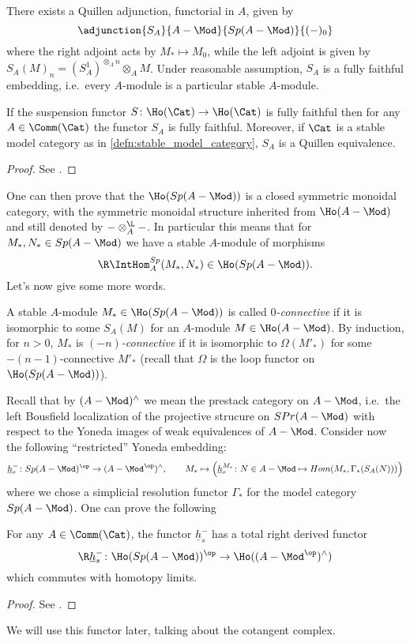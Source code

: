         There exists a Quillen adjunction, functorial in $A$, given by \[\adjunction{S_A}{A-\Mod}{Sp(A-\Mod)}{(-)_0} \] where the right adjoint acts by $M_* \mapsto M_0$, while the left adjoint is given by $S_A(M)_n = (S^1_A)^{\otimes_A n} \otimes_A M$. Under reasonable assumption, $S_A$ is a fully faithful embedding, i.e.\ every $A$-module is a particular stable $A$-module. 
        \begin{lemma}
            \label{lemma:immersion_modules_into_stable}
            If the suspension functor $S\colon \Ho(\Cat) \to \Ho(\Cat)$ is fully faithful then for any $A \in \Comm(\Cat)$ the functor $S_A$ is fully faithful. Moreover, if $\Cat$ is a stable model category as in \cref{defn:stable_model_category}, $S_A$ is a Quillen equivalence.
        \end{lemma}
        \begin{proof}
            See \cite[Lemma~1.2.11.2]{ToVe:hag2}.
        \end{proof}
        One can then prove that the $\Ho(Sp(A-\Mod))$ is a closed symmetric monoidal category, with the symmetric monoidal structure inherited from $\Ho(A-\Mod)$ and still denoted by $- \otimes_A^{\L} -$. In particular this means that for $M_*, N_* \in Sp(A-\Mod)$ we have a stable $A$-module of morphisms \[\R\IntHom_A^{Sp}(M_*, N_*) \in \Ho(Sp(A-\Mod)). \]
        Let's now give some more words.
        \begin{defn}
            \label{defn:connective_stable_modules}
            A stable $A$-module $M_* \in \Ho(Sp(A-\Mod))$ is called \emph{$0$-connective} if it is isomorphic to some $S_A(M)$ for an $A$-module $M \in \Ho(A-\Mod)$. By induction, for $n > 0$, $M_*$ is \emph{$(-n)$-connective} if it is isomorphic to $\Omega(M'_*)$ for some $-(n-1)$-connective $M'_*$ (recall that $\Omega$ is the loop functor on $\Ho(Sp(A-\Mod))$).
        \end{defn}
        Recall that by $(A-\Mod)^{\wedge}$ we mean the prestack category on $A-\Mod$, i.e.\ the left Bousfield localization of the projective strucure on $SPr(A-\Mod)$ with respect to the Yoneda images of weak equivalences of $A-\Mod$. Consider now the following ``restricted'' Yoneda embedding:
        \[\underline{h}_s^{-}\colon Sp(A-\Mod)^{\op} \to (A-\Mod^{\op})^{\wedge}, \qquad M_* \mapsto \left( \underline{h}_s^{M_*}\colon N \in A-\Mod \mapsto Hom(M_*, \Gamma_*(S_A(N))) \right) \] where we chose a simplicial resolution functor $\Gamma_*$ for the model category $Sp(A-\Mod)$.
        One can prove the following
        \begin{prop}
            For any $A \in \Comm(\Cat)$, the functor $\underline{h}_s^{-}$ has a total right derived functor \[\R\underline{h}_s^{-}\colon \Ho(Sp(A-\Mod))^{\op} \to \Ho((A-\Mod^{\op})^{\wedge}) \] which commutes with homotopy limits.
        \end{prop}
        \begin{proof}
            See \cite[Proposition~1.2.11.3]{ToVe:hag2}.
        \end{proof}
        We will use this functor later, talking about the cotangent complex.

